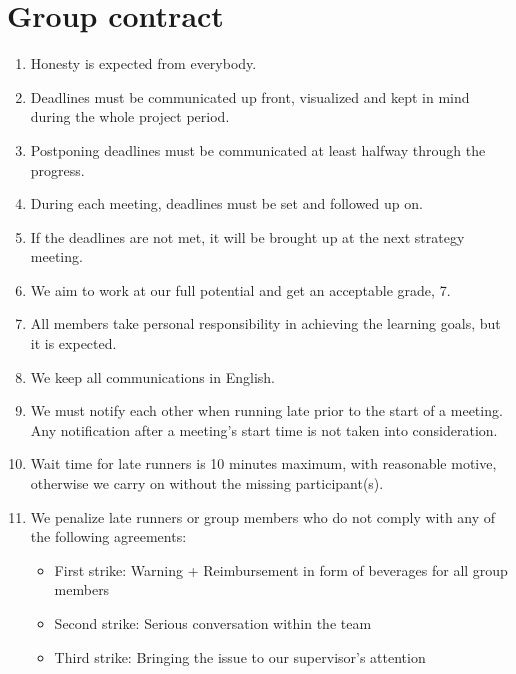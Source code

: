 \clearpage
\section{Group contract}\label{appendix:group-contract}

\begin{enumerate}
	\item Honesty is expected from everybody.
	\item Deadlines must be communicated up front, visualized and kept in mind during the whole project period.
	\item Postponing deadlines must be communicated at least halfway through the progress.
	\item During each meeting, deadlines must be set and followed up on.
	\item If the deadlines are not met, it will be brought up at the next strategy meeting.
	\item We aim to work at our full potential and get an acceptable grade, 7.
	\item All members take personal responsibility in achieving the learning goals, but it is expected.
	\item We keep all communications in English.
	\item We must notify each other when running late prior to the start of a meeting. Any notification after a meeting's start time is not taken into consideration.
	\item Wait time for late runners is 10 minutes maximum, with reasonable motive, otherwise we carry on without the missing participant(s).
	\item We penalize late runners or group members who do not comply with any of the following agreements:
	\begin{itemize}
		\item First strike: Warning + Reimbursement in form of beverages for all group members
		\item Second strike: Serious conversation within the team
		\item Third strike: Bringing the issue to our supervisor's attention
	\end{itemize}
	

\end{enumerate}
